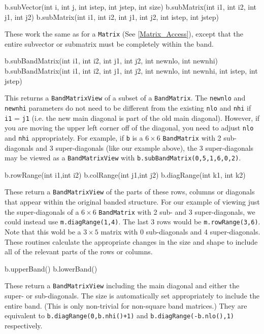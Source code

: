 \documentclass[twoside,letterpaper,11pt]{article}
\renewcommand{\tt}[1]{{\lstinline {#1}}}
\begin{document}
\begin{tmvcode}
b.subVector(int i, int j, int istep, int jstep, int size)
b.subMatrix(int i1, int i2, int j1, int j2)
b.subMatrix(int i1, int i2, int j1, int j2, int istep, int jstep)
\end{tmvcode}
These work the same as for a \tt{Matrix}
(See \ref{Matrix_Access}),
except that the entire
subvector or submatrix must be completely within the band.

\begin{tmvcode}
b.subBandMatrix(int i1, int i2, int j1, int j2, int newnlo, int newnhi)
b.subBandMatrix(int i1, int i2, int j1, int j2, int newnlo, int newnhi, 
      int istep, int jstep)
\end{tmvcode}
This returns a \tt{BandMatrixView} of a subset of a \tt{BandMatrix}.
The \tt{newnlo} and \tt{newnhi} parameters do not need to be different
from the existing \tt{nlo} and \tt{nhi} if \tt{i1} = \tt{j1} 
(i.e. the new main diagonal
is part of the old main diagonal).  However, if you are moving the upper left
corner off of the diagonal, you need to adjust \tt{nlo} and \tt{nhi} appropriately.
For example, if \tt{b} is a $6 \times 6$ \tt{BandMatrix} with 2 sub-diagonals and 
3 super-diagonals
(like our example above), the 3 super-diagonals may be viewed as a \tt{BandMatrixView}
with \tt{b.subBandMatrix(0,5,1,6,0,2)}.

\begin{tmvcode}
b.rowRange(int i1,int i2)
b.colRange(int j1,int j2)
b.diagRange(int k1, int k2)
\end{tmvcode}
These return a \tt{BandMatrixView} of the parts of these rows,
columns or diagonals that
appear within the original banded structure.  For our example of viewing just
the super-diagonals of a $6 \times 6$ \tt{BandMatrix} with 2 sub- and 
3 super-diagonals, we
could instead use \tt{m.diagRange(1,4)}.  The last 3 rows would be \tt{m.rowRange(3,6)}.
Note that this wold be a $3 \times 5$ matrix with 0 sub-diagonals and 
4 super-diagonals.
These routines calculate the appropriate changes in the size and shape to include
all of the relevant parts of the rows or columns.

\begin{tmvcode}
b.upperBand()
b.lowerBand()
\end{tmvcode}
These return a \tt{BandMatrixView} including the main diagonal and either the
super- or sub-diagonals.  The size
is automatically set appropriately to include the entire band.  (This is only
non-trivial for non-square band matrices.)  They are equivalent to
\tt{b.diagRange(0,b.nhi()+1)} and \tt{b.diagRange(-b.nlo(),1)} respectively.
\end{document}

